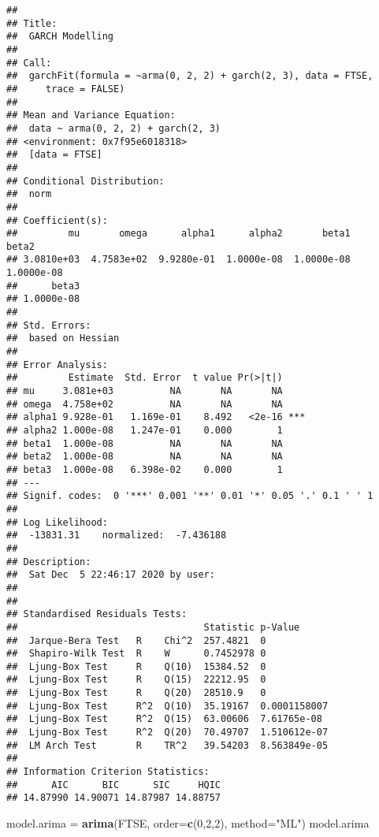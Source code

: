 \documentclass[
]{article}
\newenvironment{Shaded}{\begin{snugshade}}{\end{snugshade}}
\newcommand{\DataTypeTok}[1]{\textcolor[rgb]{0.13,0.29,0.53}{#1}}
\newcommand{\DecValTok}[1]{\textcolor[rgb]{0.00,0.00,0.81}{#1}}
\newcommand{\KeywordTok}[1]{\textcolor[rgb]{0.13,0.29,0.53}{\textbf{#1}}}
\newcommand{\NormalTok}[1]{#1}
\newcommand{\StringTok}[1]{\textcolor[rgb]{0.31,0.60,0.02}{#1}}
\begin{document}
\begin{verbatim}
## 
## Title:
##  GARCH Modelling 
## 
## Call:
##  garchFit(formula = ~arma(0, 2, 2) + garch(2, 3), data = FTSE, 
##     trace = FALSE) 
## 
## Mean and Variance Equation:
##  data ~ arma(0, 2, 2) + garch(2, 3)
## <environment: 0x7f95e6018318>
##  [data = FTSE]
## 
## Conditional Distribution:
##  norm 
## 
## Coefficient(s):
##         mu       omega      alpha1      alpha2       beta1       beta2  
## 3.0810e+03  4.7583e+02  9.9280e-01  1.0000e-08  1.0000e-08  1.0000e-08  
##      beta3  
## 1.0000e-08  
## 
## Std. Errors:
##  based on Hessian 
## 
## Error Analysis:
##         Estimate  Std. Error  t value Pr(>|t|)    
## mu     3.081e+03          NA       NA       NA    
## omega  4.758e+02          NA       NA       NA    
## alpha1 9.928e-01   1.169e-01    8.492   <2e-16 ***
## alpha2 1.000e-08   1.247e-01    0.000        1    
## beta1  1.000e-08          NA       NA       NA    
## beta2  1.000e-08          NA       NA       NA    
## beta3  1.000e-08   6.398e-02    0.000        1    
## ---
## Signif. codes:  0 '***' 0.001 '**' 0.01 '*' 0.05 '.' 0.1 ' ' 1
## 
## Log Likelihood:
##  -13831.31    normalized:  -7.436188 
## 
## Description:
##  Sat Dec  5 22:46:17 2020 by user:  
## 
## 
## Standardised Residuals Tests:
##                                 Statistic p-Value     
##  Jarque-Bera Test   R    Chi^2  257.4821  0           
##  Shapiro-Wilk Test  R    W      0.7452978 0           
##  Ljung-Box Test     R    Q(10)  15384.52  0           
##  Ljung-Box Test     R    Q(15)  22212.95  0           
##  Ljung-Box Test     R    Q(20)  28510.9   0           
##  Ljung-Box Test     R^2  Q(10)  35.19167  0.0001158007
##  Ljung-Box Test     R^2  Q(15)  63.00606  7.61765e-08 
##  Ljung-Box Test     R^2  Q(20)  70.49707  1.510612e-07
##  LM Arch Test       R    TR^2   39.54203  8.563849e-05
## 
## Information Criterion Statistics:
##      AIC      BIC      SIC     HQIC 
## 14.87990 14.90071 14.87987 14.88757
\end{verbatim}

\begin{Shaded}
\begin{Highlighting}[]
\NormalTok{model.arima =}\StringTok{ }\KeywordTok{arima}\NormalTok{(FTSE, }\DataTypeTok{order=}\KeywordTok{c}\NormalTok{(}\DecValTok{0}\NormalTok{,}\DecValTok{2}\NormalTok{,}\DecValTok{2}\NormalTok{), }\DataTypeTok{method=}\StringTok{"ML"}\NormalTok{)}
\NormalTok{model.arima}
\end{Highlighting}
\end{Shaded}
\end{document}

